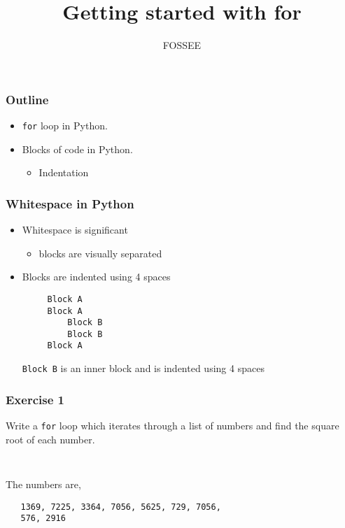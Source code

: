 \documentclass[presentation]{beamer}
\title{Getting started with for}
\author{FOSSEE}
\date{}
\begin{document}
\maketitle









\begin{frame}
\frametitle{Outline}
\label{sec-1}

\begin{itemize}
\item \texttt{for} loop in Python.
\item Blocks of code in Python.

\begin{itemize}
\item Indentation
\end{itemize}

\end{itemize}
\end{frame}
\begin{frame}[fragile]
\frametitle{Whitespace in Python}
\label{sec-2}

\begin{itemize}
\item Whitespace is significant

\begin{itemize}
\item blocks are visually separated
\end{itemize}

\item Blocks are indented using 4 spaces
\begin{verbatim}
     Block A
     Block A
         Block B
         Block B
     Block A
\end{verbatim}

    \texttt{Block B} is an inner block and is indented using 4 spaces
\end{itemize}
\end{frame}
\begin{frame}[fragile]
\frametitle{Exercise 1}
\label{sec-3}

  Write a \texttt{for} loop which iterates through a list of numbers and find
  the square root of each number.
\begin{verbatim}
   
\end{verbatim}

  The numbers are,
\begin{verbatim}
   1369, 7225, 3364, 7056, 5625, 729, 7056, 
   576, 2916
\end{verbatim}
\end{frame}
\end{document}
